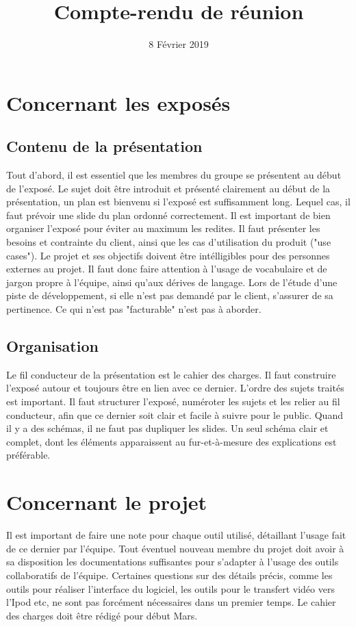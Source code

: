 \documentclass{article}
\title{Compte-rendu de réunion}
\date{8 Février 2019}
\begin{document}
\maketitle

\section{Concernant les exposés}
\subsection{Contenu de la présentation}
\bigbreak
Tout d'abord, il est essentiel que les membres du groupe se présentent au début de l'exposé.
\bigbreak
Le sujet doit être introduit et présenté clairement au début de la présentation, un plan est bienvenu si l'exposé est suffisamment long. Lequel cas, il faut prévoir une slide du plan ordonné correctement.
Il est important de bien organiser l'exposé pour éviter au maximum les redites.
\bigbreak
Il faut présenter les besoins et contrainte du client, ainsi que les cas d'utilisation du produit ("use cases"). Le projet et ses objectifs doivent être intélligibles pour des personnes externes au projet. Il faut donc faire attention à l'usage de vocabulaire et de jargon propre à l'équipe, ainsi qu'aux dérives de langage.
\bigbreak
Lors de l'étude d'une piste de développement, si elle n'est pas demandé par le client, s'assurer de sa pertinence. Ce qui n'est pas "facturable" n'est pas à aborder.
\bigbreak

\subsection{Organisation}
Le fil conducteur de la présentation est le cahier des charges. Il faut construire l'exposé autour et toujours être en lien avec ce dernier.
\bigbreak
L'ordre des sujets traités est important. Il faut structurer l'exposé, numéroter les sujets et les relier au fil conducteur, afin que ce dernier soit clair et facile à suivre pour le public.
\bigbreak
Quand il y a des schémas, il ne faut pas dupliquer les slides. Un seul schéma clair et complet, dont les éléments apparaissent au fur-et-à-mesure des explications est préférable.
\bigbreak
\section{Concernant le projet}
\bigbreak
Il est important de faire une note pour chaque outil utilisé, détaillant l'usage fait de ce dernier par l'équipe. Tout éventuel nouveau membre du projet doit avoir à sa disposition les documentations suffisantes pour s'adapter à l'usage des outils collaboratifs de l'équipe.
\bigbreak 
Certaines questions sur des détails précis, comme les outils pour réaliser l'interface du logiciel, les outils pour le transfert vidéo vers l'Ipod etc, ne sont pas forcément nécessaires dans un premier temps.
\bigbreak
Le cahier des charges doit être rédigé pour début Mars.
\end{document}
